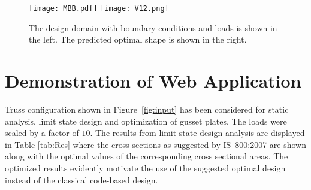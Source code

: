 \documentclass[preprint]{elsarticle}
\begin{document}
\begin{figure*}[!htbp]
\centering
\texttt{[image: MBB.pdf]} \hfil
\texttt{[image: V12.png]}
\caption{The design domain with boundary conditions and loads is shown in the left. The predicted optimal shape is shown in the right.}
\label{fig:MBB}
\end{figure*}


\section{Demonstration of Web Application} 
\label{Demo}
Truss configuration shown in Figure~\ref{fig:input} has been considered for static
analysis, limit state design and optimization of gusset plates. The loads were scaled by a factor of $10$. The results from
limit state design analysis are displayed in Table \ref{tab:Res} where the cross
sections as suggested by IS~800:2007 are shown along with the optimal values of
the corresponding cross sectional areas. The optimized results evidently motivate
the use of the suggested optimal design instead of the classical code-based design.


\begin{table*}[!htbp]
\caption{Limit state analysis results comparing IS-800:2007 code results with optimal values}
\label{tab:Res}
\end{table*}
\end{document}
